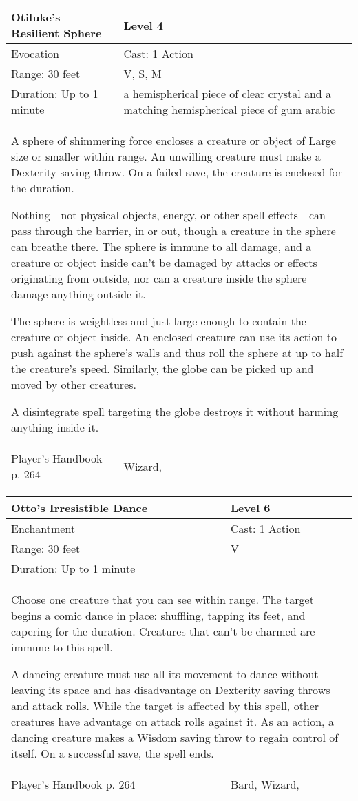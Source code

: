 \documentclass[11pt]{report}
\begin{document}
\begin{table}[H]
	\begin{tabular}{||p{6cm}|p{6cm}||}
		\hline\hline
		\bf{Otiluke’s Resilient Sphere} & Level 4\\ \hline
		Evocation & Cast: 1 Action\\ \hline
		Range: 30 feet & V, S, M\\ \hline
		Duration: Up to 1 minute & a hemispherical piece of clear crystal and a matching hemispherical piece of gum arabic\\ \hline
		\multicolumn{2}{||p{12cm}||}{A sphere of shimmering force encloses a creature or object of Large size or smaller within range. An unwilling creature must make a Dexterity saving throw. On a failed save, the creature is enclosed for the duration.

Nothing---not physical objects, energy, or other spell effects---can pass through the barrier, in or out, though a creature in the sphere can breathe there. The sphere is immune to all damage, and a creature or object inside can’t be damaged by attacks or effects originating from outside, nor can a creature inside the sphere damage anything outside it.

The sphere is weightless and just large enough to contain the creature or object inside. An enclosed creature can use its action to push against the sphere’s walls and thus roll the sphere at up to half the creature’s speed. Similarly, the globe can be picked up and moved by other creatures.

A disintegrate spell targeting the globe destroys it without harming anything inside it.}\\ \hline
Player's Handbook p. 264 & Wizard, \\ \hline\hline
	\end{tabular}
\end{table}

\begin{table}[H]
	\begin{tabular}{||p{6cm}|p{6cm}||}
		\hline\hline
		\bf{Otto’s Irresistible Dance} & Level 6\\ \hline
		Enchantment & Cast: 1 Action\\ \hline
		Range: 30 feet & V\\ \hline
		Duration: Up to 1 minute & \\ \hline
		\multicolumn{2}{||p{12cm}||}{Choose one creature that you can see within range. The target begins a comic dance in place: shuffling, tapping its feet, and capering for the duration. Creatures that can’t be charmed are immune to this spell.

A dancing creature must use all its movement to dance without leaving its space and has disadvantage on Dexterity saving throws and attack rolls. While the target is affected by this spell, other creatures have advantage on attack rolls against it. As an action, a dancing creature makes a Wisdom saving throw to regain control of itself. On a successful save, the spell ends.}\\ \hline
Player's Handbook p. 264 & Bard, Wizard, \\ \hline\hline
	\end{tabular}
\end{table}
\end{document}
